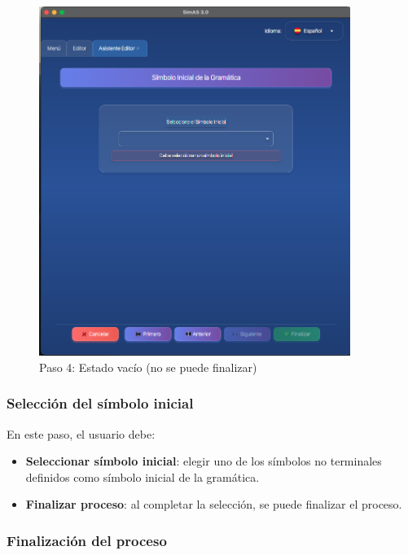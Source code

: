 \needspace{8cm}
\begin{figure}[H]
    \centering
    \includegraphics[width=0.9\textwidth]{figuras/editor/paso4_inicial_vacio.png}
    \caption{Paso 4: Estado vacío (no se puede finalizar)}
    \label{fig:paso4_vacio}
\end{figure}

\subsubsection{Selección del símbolo inicial}

En este paso, el usuario debe:

\begin{itemize}
    \item \textbf{Seleccionar símbolo inicial}: elegir uno de los símbolos no terminales definidos como símbolo inicial de la gramática.
    \item \textbf{Finalizar proceso}: al completar la selección, se puede finalizar el proceso.
\end{itemize}

\subsubsection{Finalización del proceso}

